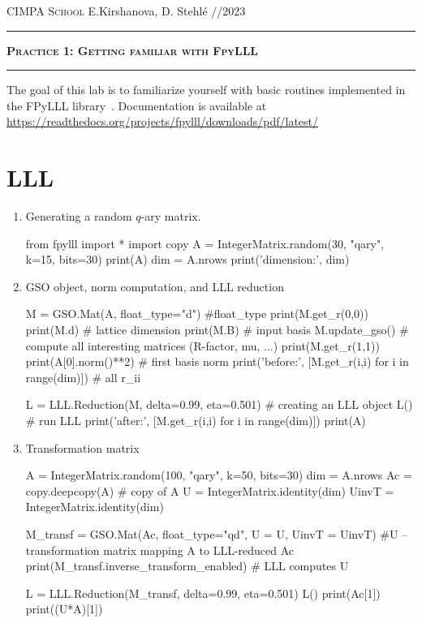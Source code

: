 \documentclass[11pt]{exam}
\theoremstyle{definition}
\begin{document}
	{\noindent
		\textsc{CIMPA School}
		\hfill {E.Kirshanova, D. Stehl{\' e} //2023\\}
	\hrule
	\begin{center}
		{\Large\textbf{
				\textsc{Practice 1: Getting familiar with FpyLLL} \\[5pt]
		} } 
	\end{center}
	}
	\hrule \vspace{5mm}
	
	\thispagestyle{empty}
	
	\vspace{0.2cm}
	

	
The goal of this lab is to familiarize yourself  with basic routines implemented in the FPyLLL library~\cite{fpylll}. Documentation is available at \url{https://readthedocs.org/projects/fpylll/downloads/pdf/latest/} \\
\section{LLL}

\begin{enumerate}

\item Generating a random $q$-ary matrix.
\begin{python}
	from fpylll import *
	import copy
	A = IntegerMatrix.random(30, "qary", k=15, bits=30)
	print(A)
	dim = A.nrows
	print('dimension:', dim)
\end{python}

\item  GSO object, norm computation, and LLL reduction

\begin{python}
	M = GSO.Mat(A, float_type="d") #float_type 
	print(M.get_r(0,0))
	print(M.d) # lattice dimension
	print(M.B) # input basis
	M.update_gso() # compute all interesting matrices (R-factor, mu, ...)
	print(M.get_r(1,1))
	print(A[0].norm()**2) # first basis norm
	print('before:', [M.get_r(i,i) for i in range(dim)]) # all r_ii
	
	L = LLL.Reduction(M, delta=0.99, eta=0.501) # creating an LLL object
	L() # run LLL
	print('after:', [M.get_r(i,i) for i in range(dim)])
	print(A)
\end{python}

\item Transformation matrix
\begin{python}
	A = IntegerMatrix.random(100, "qary", k=50, bits=30)
	dim = A.nrows
	Ac = copy.deepcopy(A) # copy of A
	U = IntegerMatrix.identity(dim)
	UinvT = IntegerMatrix.identity(dim)
	
	M_transf = GSO.Mat(Ac, float_type="qd", U = U, UinvT = UinvT) #U --  transformation matrix mapping A to LLL-reduced Ac
	print(M_transf.inverse_transform_enabled) # LLL computes U
	
	L = LLL.Reduction(M_transf, delta=0.99, eta=0.501)
	L()
	print(Ac[1])
	print((U*A)[1])
\end{python}

\end{enumerate}
\end{document}
